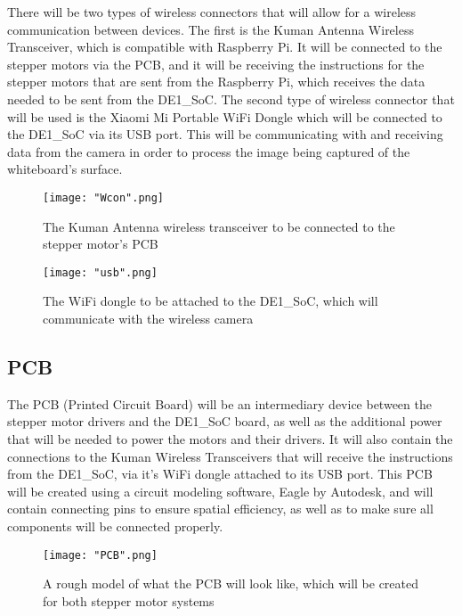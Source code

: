 There will be two types of wireless connectors that will allow for a wireless communication between devices. The first is the Kuman Antenna Wireless Transceiver, which is compatible with Raspberry Pi. It will be connected to the stepper motors via the PCB, and it will be receiving the instructions for the stepper motors that are sent from the Raspberry Pi, which receives the data needed to be sent from the DE1\_SoC. The second type of wireless connector that will be used is the Xiaomi Mi Portable WiFi Dongle which will be connected to the DE1\_SoC via its USB port. This will be communicating with and receiving data from the camera in order to process the image being captured of the whiteboard's surface.


\begin{figure}[H]
	\centering
	{\texttt{[image: "Wcon".png]}}
	\caption{ The Kuman Antenna wireless transceiver to be connected to the stepper motor's PCB
		\cite{kuman}}
	\label{fig:Wcon}
\end{figure}

\begin{figure}[H]
	\centering
	{\texttt{[image: "usb".png]}}
	\caption{ The WiFi dongle to be attached to the DE1\_SoC, which will communicate with the wireless camera
		\cite{wifi}}
	\label{fig:usb}
\end{figure}

\subsection{PCB}

The PCB (Printed Circuit Board) will be an intermediary device between the stepper motor drivers and the DE1\_SoC board, as well as the additional power that will be needed to power the motors and their drivers. It will also contain the connections to the Kuman Wireless Transceivers that will receive the instructions from the DE1\_SoC, via it\rq s WiFi dongle attached to its USB port. This PCB will be created using a circuit modeling software, Eagle by Autodesk, and will contain connecting pins to ensure spatial efficiency, as well as to make sure all components will be connected properly.

\begin{figure}[H]
	\centering
	{\texttt{[image: "PCB".png]}}
	\caption{ A rough model of what the PCB will look like, which will be created for both stepper motor systems
		\cite{smdataR}}
	\label{fig:PCB}
\end{figure}


